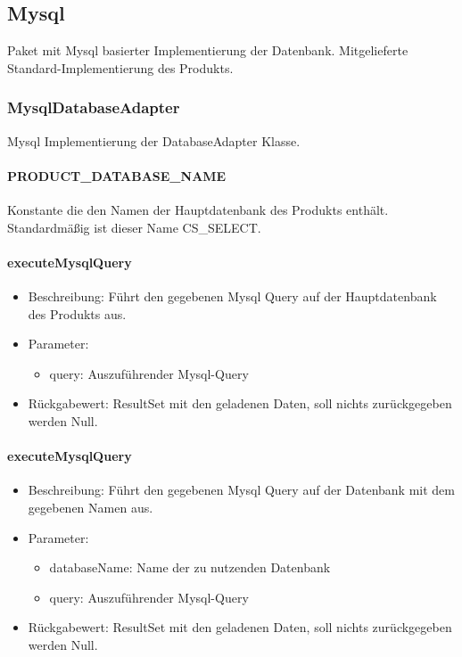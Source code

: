 \documentclass[a4paper]{scrreprt}
\begin{document}
	\subsection{Mysql}
	Paket mit Mysql basierter Implementierung der Datenbank.
	Mitgelieferte Standard-Implementierung des Produkts.

	\subsubsection{MysqlDatabaseAdapter}
	Mysql Implementierung der DatabaseAdapter Klasse.

	\paragraph{PRODUCT\_DATABASE\_NAME}
	Konstante die den Namen der Hauptdatenbank des Produkts enthält.
	Standardmäßig ist dieser Name CS\_SELECT.

	\paragraph{executeMysqlQuery}
	\begin{itemize}
		\item Beschreibung: Führt den gegebenen Mysql Query auf der Hauptdatenbank des Produkts aus.
		\item Parameter:
		\begin{itemize}
			\item query: Auszuführender Mysql-Query
		\end{itemize}
		\item Rückgabewert: ResultSet mit den geladenen Daten, soll nichts zurückgegeben werden Null.
	\end{itemize}

	\paragraph{executeMysqlQuery}
	\begin{itemize}
		\item Beschreibung: Führt den gegebenen Mysql Query auf der Datenbank mit dem gegebenen Namen aus.
		\item Parameter:
		\begin{itemize}
			\item databaseName: Name der zu nutzenden Datenbank
			\item query: Auszuführender Mysql-Query
		\end{itemize}
		\item Rückgabewert: ResultSet mit den geladenen Daten, soll nichts zurückgegeben werden Null.
	\end{itemize}
\end{document}
